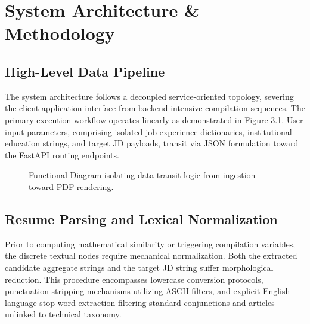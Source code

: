 \documentclass[12pt,a4paper]{report}
\begin{document}
\chapter{System Architecture \& Methodology}

\section{High-Level Data Pipeline}
The system architecture follows a decoupled service-oriented topology, severing the client application interface from backend intensive compilation sequences. The primary execution workflow operates linearly as demonstrated in Figure 3.1. User input parameters, comprising isolated job experience dictionaries, institutional education strings, and target JD payloads, transit via JSON formulation toward the FastAPI routing endpoints.

\begin{figure}[H]
    \centering
    \caption{Functional Diagram isolating data transit logic from ingestion toward PDF rendering.}
    \label{fig:pipeline}
\end{figure}

\section{Resume Parsing and Lexical Normalization}
Prior to computing mathematical similarity or triggering compilation variables, the discrete textual nodes require mechanical normalization. Both the extracted candidate aggregate strings and the target JD string suffer morphological reduction. This procedure encompasses lowercase conversion protocols, punctuation stripping mechanisms utilizing ASCII filters, and explicit English language stop-word extraction filtering standard conjunctions and articles unlinked to technical taxonomy. 
\end{document}
